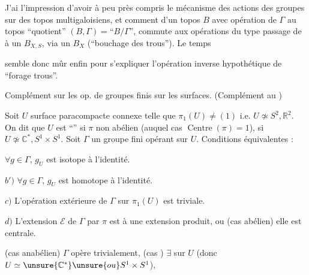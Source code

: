 J'ai l'impression d'avoir à peu près
compris le mécanisme des actions des
groupes sur des topos multigaloisiens,
et comment 
d'un topos $B$ avec opération de $\Gamma$
au topos ``quotient'' $(B,\Gamma)=\text{``}B/\Gamma\text{''}$,
commute aux opérations du type
passage de
à un $B_{X,S}$, via un
$B_X$ (``bouchage des trous'').  Le temps


semble donc mûr enfin pour s'expliquer
 l'opération inverse hypothétique
de ``forage  trous''.

 Complément sur les op. de groupes finis
sur les surfaces. (Complément au )

Soit $U$ surface paracompacte connexe \unsure{!}
telle que $\pi_1(U)\ne(1)$ i.e. $U\not\simeq S^2,\mathbb R^2$.
On dit que $U$ est ``'' si
$\pi$ non abélien (auquel cas $\operatorname{Centre}(\pi)=1$),
 si $U\not\simeq\mathbb C^*,S^1\times S^1$.
Soit $\Gamma$
un groupe fini opérant sur $U$. Conditions
équivalentes :

  $\forall g\in\Gamma$, $g_U$ est isotope à l'identité.

$b')$ $\forall g\in\Gamma$, $g_U$ est homotope à l'identité.

$c)$ L'opération extérieure de $\Gamma$ sur
$\pi_1(U)$ est triviale.

$d)$  L'extension $\mathcal E$ de $\Gamma$ par $\pi$ est
 à une extension produit, ou (cas abélien)
 elle est centrale.

 (cas anabélien) $\Gamma$ opère trivialement,
(cas ) $\exists$ 
sur $U$ (donc $U\simeq\unsure{\mathbb C^*} \unsure{ou} S^1\times S^1$),
\deleted{[de façon plus intrinsèque $U=(\pi\otimes_{\mathbb Z}\unsure{\mathbb C})/\pi$
\illegible{4}]}

